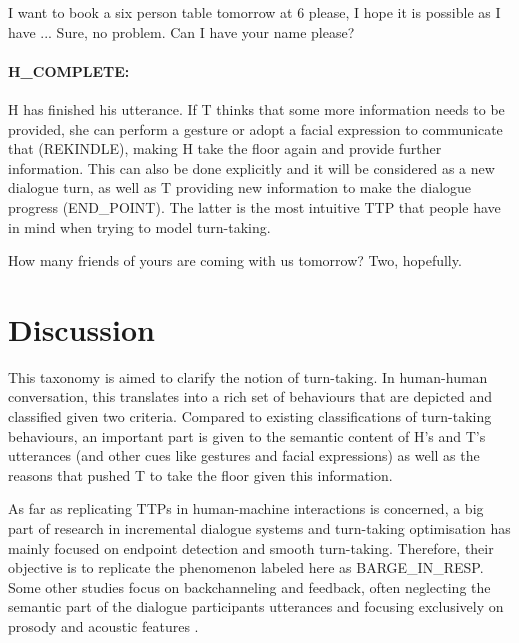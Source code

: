                  		\begin{dialogue}
							 I want to book a six person table tomorrow at 6 please, I hope it is possible as I have ...
							 Sure, no problem. Can I have your name please?
						\end{dialogue}
                        
                  	\paragraph{H\_COMPLETE:} H has finished his utterance. If T thinks that some more information needs to be provided, she can perform a gesture or adopt a facial expression to communicate that (REKINDLE), making H take the floor again and provide further information. This can also be done explicitly and it will be considered as a new dialogue turn, as well as T providing new information to make the dialogue progress (END\_POINT). The latter is the most intuitive TTP that people have in mind when trying to model turn-taking.
                    
                    	\begin{dialogue}
							 How many friends of yours are coming with us tomorrow?
							\speak{T} Two, hopefully.
						\end{dialogue}

\section{Discussion}

	This taxonomy is aimed to clarify the notion of turn-taking. In human-human conversation, this translates into a rich set of behaviours that are depicted and classified given two criteria. Compared to existing classifications of turn-taking behaviours, an important part is given to the semantic content of H's and T's utterances (and other cues like gestures and facial expressions) as well as the reasons that pushed T to take the floor given this information.

    As far as replicating TTPs in human-machine interactions is concerned, a big part of research in incremental dialogue systems and turn-taking optimisation has mainly focused on endpoint detection \cite{Raux2008} and smooth turn-taking. Therefore, their objective is to replicate the phenomenon labeled here as BARGE\_IN\_RESP. Some other studies focus on backchanneling and feedback, often neglecting the semantic part of the dialogue participants utterances and focusing exclusively on prosody and acoustic features \cite{Baumann2008,Johsdottir2008}.

